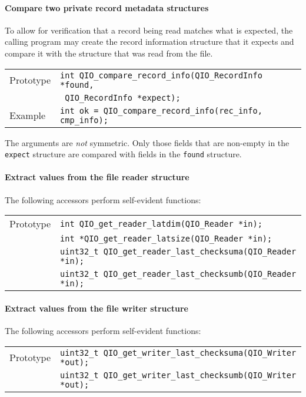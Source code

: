 \documentclass{article}
\begin{document}
\paragraph{Compare two private record metadata structures}
To allow for verification that a record being read matches what is
expected, the calling program may create the record information
structure that it expects and compare it with the structure that
was read from the file.

%
\begin{flushleft}
  \begin{tabular}{|l|l|}
  \hline
  Prototype      & \verb|int QIO_compare_record_info(QIO_RecordInfo *found,|\\
                 & \verb| QIO_RecordInfo *expect);| \\
\hline
  Example  & \verb|int ok = QIO_compare_record_info(rec_info, cmp_info);|\\
   \hline
 \end{tabular}
\end{flushleft}
%
The arguments are {\it not} symmetric.  Only those fields that are
non-empty in the \verb|expect| structure are compared with fields in
the \verb|found| structure.

\paragraph{Extract values from the file reader structure}
The following accessors perform self-evident functions:
%
%
\begin{flushleft}
  \begin{tabular}{|l|l|}
  \hline
  Prototype      & \verb|int QIO_get_reader_latdim(QIO_Reader *in);| \\
                 & \verb|int *QIO_get_reader_latsize(QIO_Reader *in);| \\
                 & \verb|uint32_t QIO_get_reader_last_checksuma(QIO_Reader *in);| \\
                 & \verb|uint32_t QIO_get_reader_last_checksumb(QIO_Reader *in);| \\
\hline
 \end{tabular}
\end{flushleft}

\paragraph{Extract values from the file writer structure}
The following accessors perform self-evident functions:
%
%
\begin{flushleft}
  \begin{tabular}{|l|l|}
  \hline
  Prototype      & \verb|uint32_t QIO_get_writer_last_checksuma(QIO_Writer *out);| \\
                 & \verb|uint32_t QIO_get_writer_last_checksumb(QIO_Writer *out);| \\
\hline
 \end{tabular}
\end{flushleft}
\end{document}
